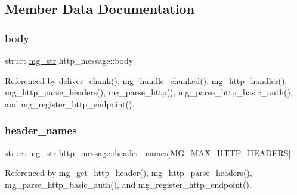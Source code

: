 \subsection{Member Data Documentation}
\mbox{\label{structhttp__message_ab2e0f6d6abe3879d9f85238ae9c10fd5_ab2e0f6d6abe3879d9f85238ae9c10fd5}} 
\subsubsection{\texorpdfstring{body}{body}}
{\footnotesize\ttfamily struct \hyperlink{structmg__str}{mg\+\_\+str} http\+\_\+message\+::body}



Referenced by deliver\+\_\+chunk(), mg\+\_\+handle\+\_\+chunked(), mg\+\_\+http\+\_\+handler(), mg\+\_\+http\+\_\+parse\+\_\+headers(), mg\+\_\+parse\+\_\+http(), mg\+\_\+parse\+\_\+http\+\_\+basic\+\_\+auth(), and mg\+\_\+register\+\_\+http\+\_\+endpoint().

\mbox{\label{structhttp__message_ad0a1f9898353bfcc80ab7f2f0a22adb0_ad0a1f9898353bfcc80ab7f2f0a22adb0}} 
\subsubsection{\texorpdfstring{header\+\_\+names}{header\_names}}
{\footnotesize\ttfamily struct \hyperlink{structmg__str}{mg\+\_\+str} http\+\_\+message\+::header\+\_\+names\mbox{[}\hyperlink{mongoose_8h_a12ec0f9dfd1ce08498bb2aeed8a80d40_a12ec0f9dfd1ce08498bb2aeed8a80d40}{M\+G\+\_\+\+M\+A\+X\+\_\+\+H\+T\+T\+P\+\_\+\+H\+E\+A\+D\+E\+RS}\mbox{]}}



Referenced by mg\+\_\+get\+\_\+http\+\_\+header(), mg\+\_\+http\+\_\+parse\+\_\+headers(), mg\+\_\+parse\+\_\+http\+\_\+basic\+\_\+auth(), and mg\+\_\+register\+\_\+http\+\_\+endpoint().

\mbox{\label{structhttp__message_a95a0bfefd3a05bb3db52ce50a2ef71f4_a95a0bfefd3a05bb3db52ce50a2ef71f4}} 

